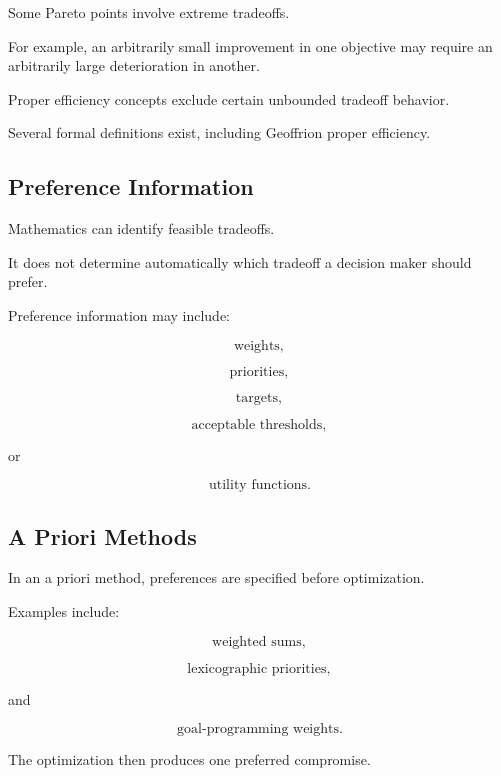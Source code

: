 Some Pareto points involve extreme tradeoffs.

For example, an arbitrarily small improvement in one objective may require
an arbitrarily large deterioration in another.

Proper efficiency concepts exclude certain unbounded tradeoff behavior.

Several formal definitions exist, including Geoffrion proper efficiency.

\subsection{Preference Information}
\label{subsec:preference-information}

Mathematics can identify feasible tradeoffs.

It does not determine automatically which tradeoff a decision maker should
prefer.

Preference information may include:

\[
\boxed{
\text{weights},
}
\]

\[
\boxed{
\text{priorities},
}
\]

\[
\boxed{
\text{targets},
}
\]

\[
\boxed{
\text{acceptable thresholds},
}
\]

or

\[
\boxed{
\text{utility functions}.
}
\]

\subsection{A Priori Methods}
\label{subsec:a-priori-multiobjective}

In an a priori method, preferences are specified before optimization.

Examples include:

\[
\boxed{
\text{weighted sums},
}
\]

\[
\boxed{
\text{lexicographic priorities},
}
\]

and

\[
\boxed{
\text{goal-programming weights}.
}
\]

The optimization then produces one preferred compromise.

